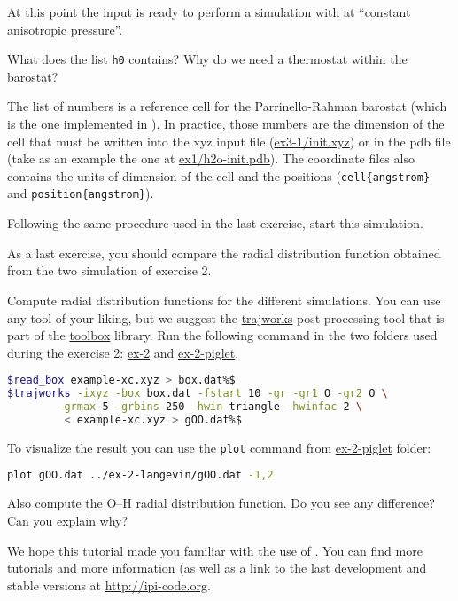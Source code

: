 \documentclass{article}
\begin{document}
\begin{Exercise}[label={inputs},title={PIMD-NPT simulation of ice}]
At this point the input is ready to perform a simulation with at
``constant anisotropic pressure''.

\Question
What does the list \texttt{h0} contains? Why do we need a thermostat
within the barostat?

The list of numbers is a reference cell for the Parrinello-Rahman
barostat (which is the one implemented in \ipi). In practice, those
numbers are the dimension of the cell that must be written into the xyz
input file (\url{ex3-1/init.xyz}) or in the pdb file (take as an
example the one at \url{ex1/h2o-init.pdb}). The coordinate files
also contains the units of dimension of the cell and the positions
(\texttt{cell\{angstrom\}} and \texttt{position\{angstrom\}}).

\Question
Following the same procedure used in the last exercise, start this
simulation.

\end{Exercise}

\begin{Exercise}[label={inputs},title={Radial distribution function comparison}]
As a last exercise, you should compare the radial distribution
function obtained from the two simulation of exercise 2.

\Question
Compute radial distribution functions for the different simulations. You
can use any tool of your liking, but we suggest the \url{trajworks}
post-processing tool that is part of the \url{toolbox} library.
Run the following command in the two folders used during the exercise
2: \url{ex-2} and \url{ex-2-piglet}.
\begin{lstlisting}[language=bash]
$read_box example-xc.xyz > box.dat%$
$trajworks -ixyz -box box.dat -fstart 10 -gr -gr1 O -gr2 O \
        -grmax 5 -grbins 250 -hwin triangle -hwinfac 2 \
         < example-xc.xyz > gOO.dat%$
\end{lstlisting}

To visualize the result you can use the \texttt{plot} command from
\url{ex-2-piglet} folder:
\begin{lstlisting}[language=bash]
plot gOO.dat ../ex-2-langevin/gOO.dat -1,2
\end{lstlisting}
Also compute the O--H radial distribution function.
Do you see any difference? Can you explain why?

\end{Exercise}

We hope this tutorial made you familiar with the use of \ipi. You
can find more tutorials and more information (as well as a link to the
last development and stable versions at \url{http://ipi-code.org}.
\end{document}
